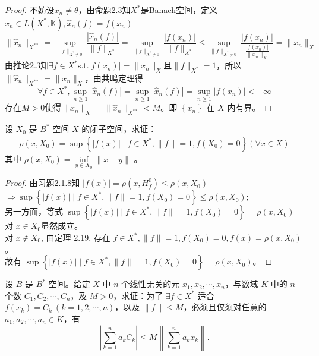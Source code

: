 \documentclass[lang=cn,newtx,10pt,scheme=chinese,thmcnt=chapter]{elegantbook}
\begin{document}
\begin{proof}
    不妨设$x_n\neq \theta$，由命题2.3知${X}^*$是Banach空间，定义$\hat{x}_n\in {L}({X}^*,\mathbb{K}),\hat{x}_n(f)=f(x_n)$
    \[\|\hat{x}_n\|_{{X}^{**}}=\sup\limits_{\|f\|_{{X}^*\neq 0}}\frac{|\hat{x}_n(f)|}{\|f\|_{{X}^*}}=\sup\limits_{\|f\|_{{X}^*\neq 0}}\frac{|f(x_n)|}{\|f\|_{{X}^*}}\leqslant \sup\limits_{\|f\|_{{X}^*\neq 0}}\frac{|f(x_n)|}{\frac{|f(x_n)|}{\|x_n\|_{{X}}}}=\|x_n\|_{{X}}\]
    由推论2.3知$\exists f\in {X}^*$s.t.$|f(x_n)|=\|x_n\|_{{X}}$且$\|f\|_{{X}^*}=1$，所以$\|\hat{x}_n\|_{{X}^{**}}=\|x_n\|_{{X}}$，由共鸣定理得
    \[
\forall f\in {X}^{*},\sup\limits_{n\geqslant 1}|\hat{x}_n(f)|=\sup\limits_{n\geqslant 1}|\hat{x}_n(f)|
    =\sup\limits_{n\geqslant 1}|f(x_n)|<+\infty
    \]
    存在$M>0$使得$\|x_n\|_{{X}}=\|\hat{x}_n\|_{{X}^{**}}<M$。即 $\left\{x_n\right\}$ 在 ${X}$ 内有界。
\end{proof}
\begin{problem}
设 ${X}_0$ 是 $B^*$ 空间 ${X}$ 的闭子空间，求证：
\[
\begin{gathered}
\rho\left(x, {X}_0\right)=\sup \left\{|f(x)| \mid f \in {X}^*,  \|f\|=1,  f\left({X}_0\right)=0\right\} 
(\forall x \in {X})
\end{gathered}
\]
其中 $\rho\left(x, {X}_0\right)=\inf\limits_{y \in {X}_0}\|x-y\|$ 。
\end{problem}
\begin{proof}
由习题2.1.8知 $|f(x)|=\rho(x, H_f^0) \leqslant \rho\left(x, {X} _0\right)$$\Rightarrow \sup \left\{|f(x)| \mid f \in {X} ^*,\|f\|=1, f\left( {X} _0\right)=0\right\} \leqslant \rho\left(x, {X} _0\right)$;\\
另一方面，等式 $\sup \left\{|f(x)|\mid f \in {X} ^*,\|f\|=1, f\left( {X} _0\right)=0\right\}=\rho\left(x, {X} _0\right)$ 对 $x \in {X} _0$显然成立。\\
对 $x \notin {X} _0$, 由定理 2.19, 存在 $f \in {X} ^*,\|f\|=1, f\left( {X} _0\right)=0, f(x)=\rho\left(x, {X} _0\right)$。\\
故有 $\sup \left\{|f(x)| \mid f \in {X} ^*,\|f\|=1, f\left( {X} _0\right)=0\right\}=\rho\left(x, {X} _0\right)$。
\end{proof}
\begin{problem}
设 $B$ 是 $B^*$ 空间。给定 ${X}$ 中 $n$ 个线性无关的元 $x_1, x_2, \cdots, x_n$，与数域 $K$ 中的 $n$ 个数 $C_1, C_2, \cdots, C_n$，及 $M>0$，求证：为了 $\exists f \in {X}^*$ 适合 $f\left(x_k\right)=C_k \ (k=1,2, \cdots, n)$，以及 $\|f\| \leqslant M$，必须且仅须对任意的 $a_1, a_2, \cdots, a_n \in K$，有
\[
\left|\sum_{k=1}^n a_k C_k\right| \leqslant M \left\|\sum_{k=1}^n a_k x_k\right\| .
\]
\end{problem}
\end{document}
